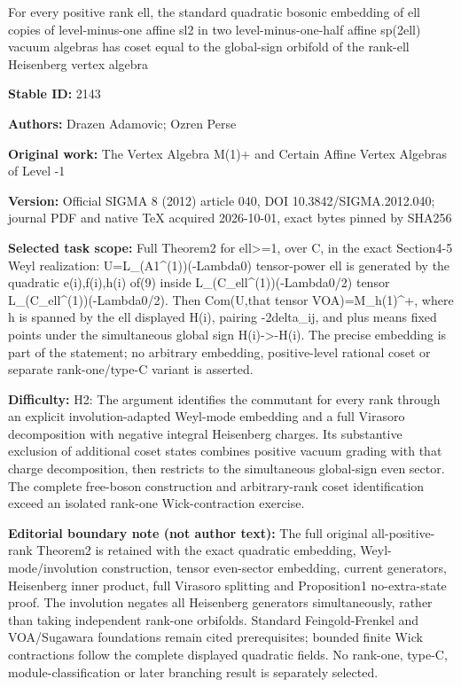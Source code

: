 \documentclass[11pt]{article}
\newcommand{\1}{\bf 1}
\begin{document}
\begin{center}\Large For every positive rank ell, the standard quadratic bosonic embedding of ell copies of level-minus-one affine sl2 in two level-minus-one-half affine sp(2ell) vacuum algebras has coset equal to the global-sign orbifold of the rank-ell Heisenberg vertex algebra\end{center}
\noindent\textbf{Stable ID:} 2143\par
\noindent\textbf{Authors:} Drazen Adamovic; Ozren Perse\par
\noindent\textbf{Original work:} The Vertex Algebra M(1)+\allowbreak{} and Certain Affine Vertex Algebras of Level -1\par
\noindent\textbf{Version:} Official SIGMA 8 (2012) article 040, DOI 10.3842/SIGMA.2012.040; journal PDF and native TeX acquired 2026-10-01, exact bytes pinned by SHA256\par
\noindent\textbf{Selected task scope:} Full Theorem2 for ell>=\allowbreak{}1, over C, in the exact Section4-5 Weyl realization: U=\allowbreak{}L\_(A1\textasciicircum{}(1))(-Lambda0) tensor-power ell is generated by the quadratic e(i),f(i),h(i) of(9) inside L\_(C\_ell\textasciicircum{}(1))(-Lambda0/2) tensor L\_(C\_ell\textasciicircum{}(1))(-Lambda0/2). Then Com(U,that tensor VOA)=\allowbreak{}M\_h(1)\textasciicircum{}+\allowbreak{}, where h is spanned by the ell displayed H(i), pairing -2delta\_ij, and plus means fixed points under the simultaneous global sign H(i)->-H(i). The precise embedding is part of the statement; no arbitrary embedding, positive-level rational coset or separate rank-one/type-C variant is asserted.\par
\noindent\textbf{Difficulty:} H2: The argument identifies the commutant for every rank through an explicit involution-adapted Weyl-mode embedding and a full Virasoro decomposition with negative integral Heisenberg charges. Its substantive exclusion of additional coset states combines positive vacuum grading with that charge decomposition, then restricts to the simultaneous global-sign even sector. The complete free-boson construction and arbitrary-rank coset identification exceed an isolated rank-one Wick-contraction exercise.\par
\noindent\textbf{Editorial boundary note (not author text):} The full original all-positive-rank Theorem2 is retained with the exact quadratic embedding, Weyl-mode/involution construction, tensor even-sector embedding, current generators, Heisenberg inner product, full Virasoro splitting and Proposition1 no-extra-state proof. The involution negates all Heisenberg generators simultaneously, rather than taking independent rank-one orbifolds. Standard Feingold-Frenkel and VOA/Sugawara foundations remain cited prerequisites; bounded finite Wick contractions follow the complete displayed quadratic fields. No rank-one, type-C, module-classification or later branching result is separately selected.\par
\end{document}
